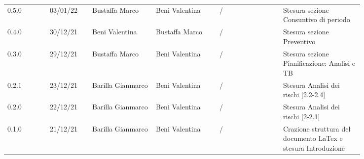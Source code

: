 {\begin{tabular}{p{0.10\linewidth}p{0.10\linewidth}p{0.15\linewidth}p{0.15\linewidth}p{0.15\linewidth}p{0.19\linewidth}}
	\rowcolor[RGB]{233, 245, 206}
	0.5.0 & 03/01/22 & Bustaffa Marco& Beni Valentina & / & Stesura sezione Consuntivo di periodo\\
	\rowcolor[RGB]{216, 235, 171}
	0.4.0 & 30/12/21 & Beni Valentina& Bustaffa Marco & / & Stesura sezione Preventivo\\
	\rowcolor[RGB]{233, 245, 206}
	0.3.0 & 29/12/21 & Bustaffa Marco& Beni Valentina & / & Stesura sezione Pianificazione: Analisi e TB\\
	\rowcolor[RGB]{216, 235, 171}
	0.2.1 & 23/12/21 & Barilla Gianmarco& Beni Valentina & / & Stesura Analisi dei rischi [2.2-2.4]\\
	\rowcolor[RGB]{233, 245, 206}
	0.2.0 & 22/12/21 & Barilla Gianmarco & Beni Valentina & / & Stesura Analisi dei rischi [2-2.1]\\
	\rowcolor[RGB]{216, 235, 171}
	0.1.0 & 21/12/21 & Barilla Gianmarco & Beni Valentina & / & Crazione struttura del documento LaTex e stesura Introduzione\\	

\end{tabular}	
}